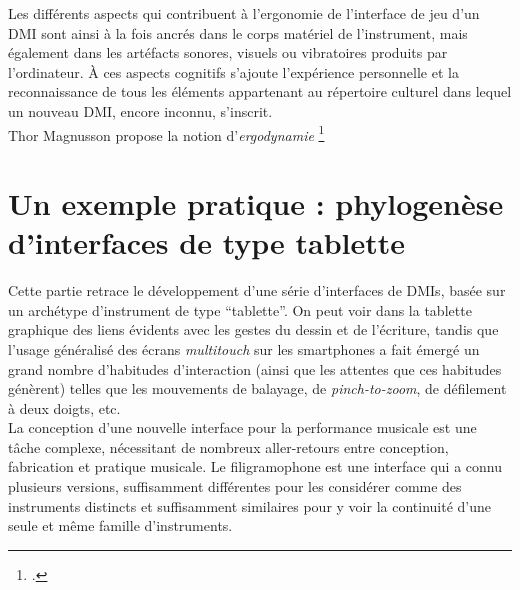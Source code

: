 \noindent Les différents aspects qui contribuent à l'ergonomie de l'interface de jeu d'un \gls{DMI} sont ainsi à la fois ancrés dans le corps matériel de l'instrument, mais également dans les artéfacts sonores, visuels ou vibratoires produits par l'ordinateur. À ces aspects cognitifs s'ajoute l'expérience personnelle et la reconnaissance de tous les éléments appartenant au répertoire culturel dans lequel un nouveau \gls{DMI}, encore inconnu, s'inscrit.\\
\indent Thor Magnusson propose la notion d'\textit{ergodynamie} \footnote{ \cite{magnusson_ergodynamics_2019}.}


\section{Un exemple pratique : phylogenèse d'interfaces de type tablette}
\label{sec:interfaces:phylogenese}

\noindent Cette partie retrace le développement d'une série d'interfaces de \glspl{DMI}, basée sur un archétype d'instrument de type ``tablette''. On peut voir dans la tablette graphique des liens évidents avec les gestes du dessin et de l'écriture, tandis que l'usage généralisé des écrans \textit{multitouch} sur les smartphones a fait émergé un grand nombre d'habitudes d'interaction (ainsi que les attentes que ces habitudes génèrent) telles que les mouvements de balayage, de \textit{pinch-to-zoom}, de défilement à deux doigts, etc.\\
\indent La conception d’une nouvelle interface pour la performance musicale est une tâche complexe, nécessitant de nombreux aller-retours entre conception, fabrication et pratique musicale. Le filigramophone est une interface qui a connu plusieurs versions, suffisamment différentes pour les considérer comme des instruments distincts et suffisamment similaires pour y voir la continuité d’une seule et même famille d'instruments.

